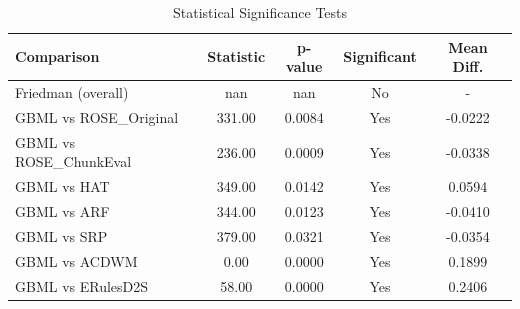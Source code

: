\begin{table}[htbp]
\centering
\caption{Statistical Significance Tests}
\label{tab:statistical_tests}
\begin{tabular}{lcccc}
\toprule
Comparison & Statistic & p-value & Significant & Mean Diff. \\
\midrule
Friedman (overall) & nan & nan & No & - \\
\midrule
GBML vs ROSE_Original & 331.00 & 0.0084 & Yes & -0.0222 \\
GBML vs ROSE_ChunkEval & 236.00 & 0.0009 & Yes & -0.0338 \\
GBML vs HAT & 349.00 & 0.0142 & Yes & 0.0594 \\
GBML vs ARF & 344.00 & 0.0123 & Yes & -0.0410 \\
GBML vs SRP & 379.00 & 0.0321 & Yes & -0.0354 \\
GBML vs ACDWM & 0.00 & 0.0000 & Yes & 0.1899 \\
GBML vs ERulesD2S & 58.00 & 0.0000 & Yes & 0.2406 \\
\bottomrule
\end{tabular}
\end{table}
